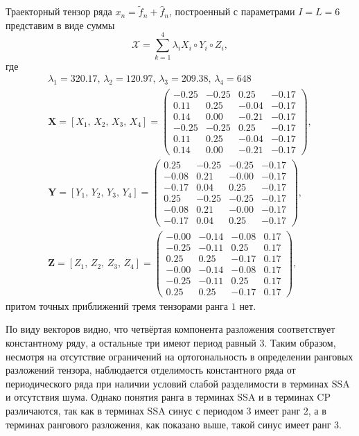 \documentclass[specialist,
    substylefile = spbu_report.rtx,
    subf,href,colorlinks=true, 12pt]{disser}
\theoremstyle{plain}
\theoremstyle{definition}
\theoremstyle{remark}
\begin{document}
    Траекторный тензор ряда $x_n=\tilde{f}_n+\hat{f}_n$, построенный с параметрами $I=L=6$ представим в виде суммы
    \[
        \mathcal{X}=\sum_{k=1}^{4}\lambda_i X_i \circ Y_i\circ Z_i,
    \]
    где
    \begin{gather*}
        \lambda_1 =320.17,\, \lambda_2 =120.97,\, \lambda_3 =209.38,\, \lambda_4=648\\
        \mathbf{X}=[X_1,\, X_2,\, X_3,\, X_4] =
        \begin{pmatrix}
            -0.25 & -0.25 & 0.25  & -0.17 \\
            0.11  & 0.25  & -0.04 & -0.17 \\
            0.14  & 0.00  & -0.21 & -0.17 \\
            -0.25 & -0.25 & 0.25  & -0.17 \\
            0.11  & 0.25  & -0.04 & -0.17 \\
            0.14  & 0.00  & -0.21 & -0.17
        \end{pmatrix},\\
        \mathbf{Y}=[Y_1,\, Y_2,\, Y_3,\, Y_4] =
        \begin{pmatrix}
            0.25  & -0.25 & -0.25 & -0.17 \\
            -0.08 & 0.21  & -0.00 & -0.17 \\
            -0.17 & 0.04  & 0.25  & -0.17 \\
            0.25  & -0.25 & -0.25 & -0.17 \\
            -0.08 & 0.21  & -0.00 & -0.17 \\
            -0.17 & 0.04  & 0.25  & -0.17
        \end{pmatrix},\\
        \mathbf{Z}=[Z_1,\, Z_2,\, Z_3,\, Z_4] =
        \begin{pmatrix}
            -0.00 & -0.14 & -0.08 & 0.17 \\
            -0.25 & -0.11 & 0.25  & 0.17 \\
            0.25  & 0.25  & -0.17 & 0.17 \\
            -0.00 & -0.14 & -0.08 & 0.17 \\
            -0.25 & -0.11 & 0.25  & 0.17 \\
            0.25  & 0.25  & -0.17 & 0.17
        \end{pmatrix},
    \end{gather*}
    притом точных приближений тремя тензорами ранга $1$ нет.

    По виду векторов видно, что четвёртая компонента разложения соответствует константному ряду, а остальные три имеют период равный $3$.
    Таким образом, несмотря на отсутствие ограничений на ортогональность в определении ранговых разложений тензора, наблюдается
    отделимость константного ряда от периодического ряда при наличии условий слабой разделимости в терминах SSA и отсутствия
    шума.
    Однако понятия ранга в терминах SSA и в терминах CP различаются, так как в терминах SSA синус с периодом $3$ имеет ранг $2$, а в
    терминах рангового разложения, как показано выше, такой синус имеет ранг $3$.
\end{document}
